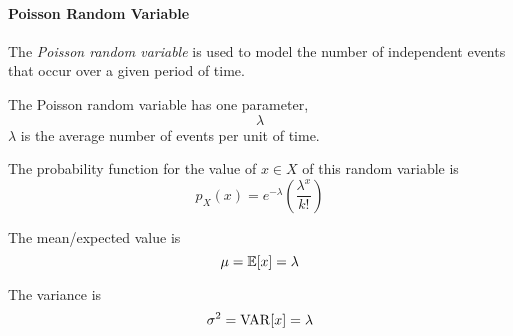 \paragraph{Poisson Random Variable}\label{par:Poisson_Random_Variable}
\begin{definition}\label{def:Poisson_Random_Variable}
  The \emph{Poisson random variable} is used to model the number of independent events that occur over a given period of time.

  The Poisson random variable has one parameter,
  \begin{equation}\label{eq:Poisson_Random_Variable-Lambda_Parameter}
    \lambda
  \end{equation}
  $\lambda$ is the average number of events per unit of time.

  The probability function for the value of $x \in X$ of this random variable is
  \begin{equation}\label{eq:Poisson_Random_Variable-Probability_Function}
    p_{X}(x) = e^{-\lambda} \left( \frac{\lambda^{x}}{k!} \right)
  \end{equation}

  The mean/expected value is
  \begin{equation}\label{eq:Poisson_Random_Variable-Expected_Value}
    \mu = \operatorname{\operatorname{\mathbb{E}}}[x] = \lambda
  \end{equation}

  The variance is
  \begin{equation}\label{eq:Poisson_Random_Variable-Variance}
    \sigma^{2} = \operatorname{\operatorname{VAR}}[x] = \lambda
  \end{equation}
\end{definition}

